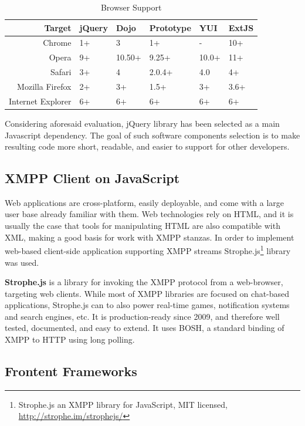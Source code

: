 	\begin{table}[H]
	\centering
	\begin{tabular}{|r|l|l|l|l|l|}
	\hline
	Target 			& jQuery & Dojo & Prototype & YUI & ExtJS \\
	\hline
	\hline
	Chrome		& 1+ & 3 & 1+ & - & 10+ \\
	\hline
	Opera		& 9+ & 10.50+ & 9.25+ & 10.0+ & 11+ \\
	\hline
	Safari		& 3+ & 4 & 2.0.4+ & 4.0 & 4+ \\
	\hline
	Mozilla Firefox		& 2+ & 3+ & 1.5+ & 3+ & 3.6+ \\
	\hline
	Internet Explorer		& 6+ & 6+ & 6+ & 6+ & 6+ \\
	\hline
	\end{tabular}
	\caption[Browser Support]{Browser Support}
	\end{table}


	 Considering aforesaid evaluation, jQuery library has been selected as a main Javascript dependency. The goal of such software components selection is to make resulting code more short, readable, and easier to support for other developers.

    \subsection{XMPP Client on JavaScript}

	Web applications are cross-platform, easily deployable, and come with a large user base already familiar with them. Web technologies rely on HTML, and it is usually the case that tools for manipulating HTML are also compatible with XML, making a good basis for work with XMPP stanzas. In order to implement web-based client-side application supporting XMPP streams Strophe.js\footnote{Strophe.js an XMPP library for JavaScript, MIT licensed, \url{http://strophe.im/strophejs/}} library was used.

    \textbf{Strophe.js} is a library for invoking the XMPP protocol from a web-browser, targeting web clients. While most of XMPP libraries are focused on chat-based applications, Strophe.js can to also power real-time games, notification systems and search engines, etc. It is production-ready since 2009, and therefore well tested, documented, and easy to extend. It uses BOSH, a standard binding of XMPP to HTTP using long polling.

\subsection{Frontent Frameworks}
